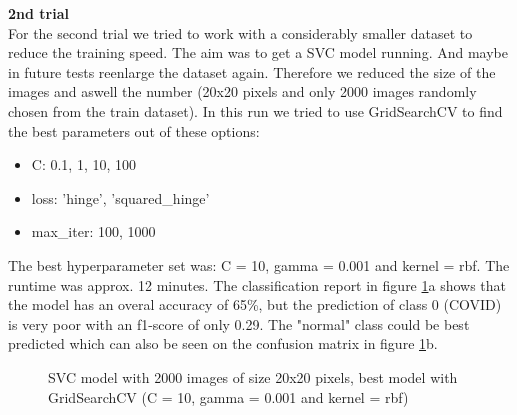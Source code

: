 \documentclass{article}
\begin{document}
\textbf{2nd trial}\\
For the second trial we tried to work with a considerably smaller dataset to reduce the training speed. The aim was to get a SVC model running. And maybe in future 
tests reenlarge the dataset again. Therefore we reduced the size of the images and aswell the number (20x20 pixels and only 2000 images randomly chosen from the train 
dataset). In this run we tried to use GridSearchCV to find the best parameters out of these options: 
\begin{itemize}
    \item C: 0.1, 1, 10, 100
    \item loss: 'hinge', 'squared\_hinge'
    \item max\_iter: 100, 1000
\end{itemize}

The best hyperparameter set was: C = 10,  gamma = 0.001 and kernel = rbf. The runtime was approx. 12 minutes. The classification report in figure 
\ref{fig:SVC_2000_20x20_grid}a shows that the model has an overal accuracy of 65\%, but the prediction of class 0 (COVID) is very poor with an f1-score of only 0.29. The "normal" class could be best 
predicted which can also be seen on the confusion matrix in figure \ref{fig:SVC_2000_20x20_grid}b.

\begin{figure}[!ht]
  \centering
  \qquad
  \caption{SVC model with 2000 images of size 20x20 pixels, best model with GridSearchCV (C = 10,  gamma = 0.001 and kernel = rbf)}
  \label{fig:SVC_2000_20x20_grid}
\end{figure}
\end{document}
